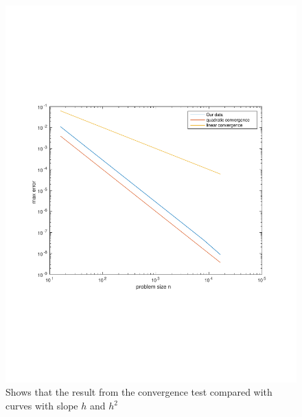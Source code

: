 \begin{figure}[h]
\centering
\includegraphics[width=0.7\linewidth]{./figures/checkConv}
\caption{Shows that the result from the convergence test compared with curves with slope $h$ and $h^2$}
\label{fig:checkConv}
\end{figure}